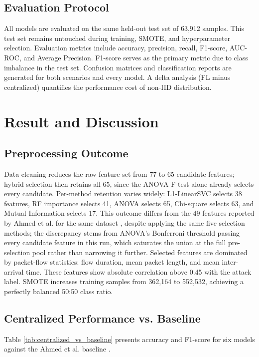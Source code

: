\documentclass[conference, a4paper]{IEEEtran}
\begin{document}
\subsection{Evaluation Protocol}

All models are evaluated on the same held-out test set of 63,912 samples. This test set remains untouched during training, SMOTE, and hyperparameter selection. Evaluation metrics include accuracy, precision, recall, F1-score, AUC-ROC, and Average Precision. F1-score serves as the primary metric due to class imbalance in the test set. Confusion matrices and classification reports are generated for both scenarios and every model. A delta analysis (FL minus centralized) quantifies the performance cost of non-IID distribution.

\section{Result and Discussion}

\subsection{Preprocessing Outcome}

Data cleaning reduces the raw feature set from 77 to 65 candidate features; hybrid selection then retains all 65, since the ANOVA F-test alone already selects every candidate. Per-method retention varies widely: L1-LinearSVC selects 38 features, RF importance selects 41, ANOVA selects 65, Chi-square selects 63, and Mutual Information selects 17. This outcome differs from the 49 features reported by Ahmed et al. for the same dataset \cite{b10}, despite applying the same five selection methods; the discrepancy stems from ANOVA's Bonferroni threshold passing every candidate feature in this run, which saturates the union at the full pre-selection pool rather than narrowing it further. Selected features are dominated by packet-flow statistics: flow duration, mean packet length, and mean inter-arrival time. These features show absolute correlation above 0.45 with the attack label. SMOTE increases training samples from 362,164 to 552,532, achieving a perfectly balanced 50:50 class ratio.

\subsection{Centralized Performance vs. Baseline}

Table \ref{tab:centralized_vs_baseline} presents accuracy and F1-score for six models against the Ahmed et al. baseline \cite{b10}.
\end{document}
